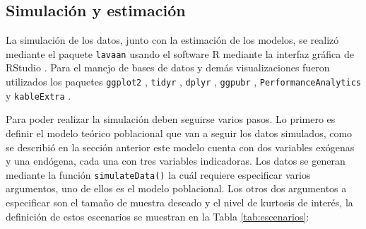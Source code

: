 \documentclass[english]{revcoles}
\begin{document}
\subsection{Simulación y estimación}

La simulación de los datos, junto con la estimación de los modelos, se realizó mediante el paquete \texttt{lavaan} \cite{lavaan} usando el software R \cite{R} mediante la interfaz gráfica de RStudio \cite{RStudio}. Para el manejo de bases de datos y demás visualizaciones fueron utilizados los paquetes \texttt{ggplot2} \cite{ggplot2}, \texttt{tidyr} \cite{tidyr}, \texttt{dplyr} \cite{dplyr}, \texttt{ggpubr} \cite{ggpubr}, \texttt{PerformanceAnalytics} \cite{PerformanceAnalytics} y \texttt{kableExtra} \cite{kableExtra}.

Para poder realizar la simulación deben seguirse varios pasos. Lo primero es definir el modelo teórico poblacional que van a seguir los datos simulados, como se describió en la sección anterior este modelo cuenta con dos variables exógenas y una endógena, cada una con tres variables indicadoras. Los datos se generan mediante la función \texttt{simulateData()} la cuál requiere especificar varios argumentos, uno de ellos es el modelo poblacional. Los otros dos argumentos a especificar son el tamaño de muestra deseado y el nivel de kurtosis de interés, la definición de estos escenarios se muestran en la Tabla \ref{tab:escenarios}:

\begin{table}[!h]
  \caption{\label{tab:unnamed-chunk-6}\label{tab:escenarios}Escenarios de simulación}
  \centering
\end{table}
\end{document}
